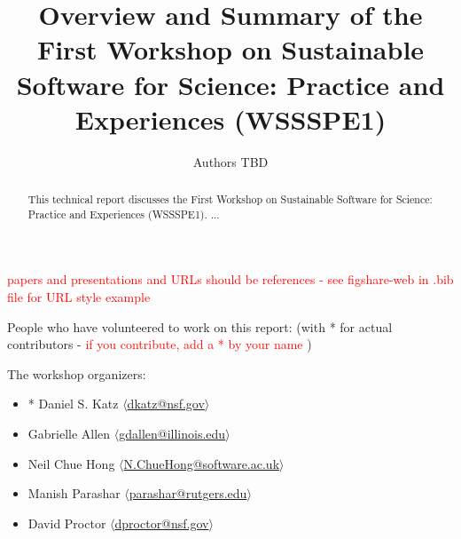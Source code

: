 \documentclass[11pt, oneside]{amsart}
\newcommand{\note}[1]{ {\textcolor{red}    { #1 }}}
\begin{document}
\title[]{Overview and Summary of the First Workshop on Sustainable Software for Science: Practice and Experiences (WSSSPE1)}

\author{Authors TBD}

%
%
%
%
%


\begin{abstract}
This technical report discusses the First Workshop on Sustainable Software for Science: Practice and Experiences (WSSSPE1). ...
\end{abstract}


\maketitle

\note{papers and presentations and URLs should be references - see
  figshare-web in .bib file for URL style example}

People who have volunteered to work on this report: (with * for actual
contributors - \note{if you contribute, add a * by your name})

The workshop organizers:
\begin{itemize}
\item * Daniel S. Katz $\langle$\url{dkatz@nsf.gov}$\rangle$
\item Gabrielle Allen $\langle$\url{gdallen@illinois.edu}$\rangle$
\item Neil Chue Hong $\langle$\url{N.ChueHong@software.ac.uk}$\rangle$
\item Manish Parashar $\langle$\url{parashar@rutgers.edu}$\rangle$
\item David Proctor $\langle$\url{dproctor@nsf.gov}$\rangle$
\end{itemize}
\end{document}

